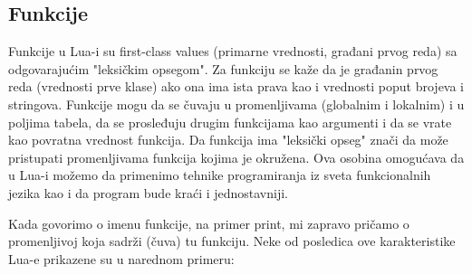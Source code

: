 \documentclass[a4paper]{article}
\begin{document}
\subsection{Funkcije}
Funkcije u Lua-i su first-class values (primarne vrednosti, građani prvog reda) sa odgovarajućim "leksičkim opsegom". Za funkciju se kaže da je građanin prvog reda (vrednosti prve klase) ako ona ima ista prava kao i vrednosti poput brojeva i stringova. Funkcije mogu da se čuvaju u promenljivama (globalnim i lokalnim) i u poljima tabela, da se prosleđuju drugim funkcijama kao argumenti i da se vrate kao povratna vrednost funkcija. Da funkcija ima "leksički opseg" znači da može pristupati promenljivama funkcija kojima je okružena. Ova osobina omogućava da u Lua-i možemo da primenimo tehnike programiranja iz sveta funkcionalnih jezika kao i da program bude kraći i jednostavniji.

Kada govorimo o imenu funkcije, na primer print, mi zapravo pričamo o promenljivoj koja sadrži (čuva) tu funkciju. Neke od posledica ove karakteristike Lua-e prikazene su u narednom primeru:
\end{document}

